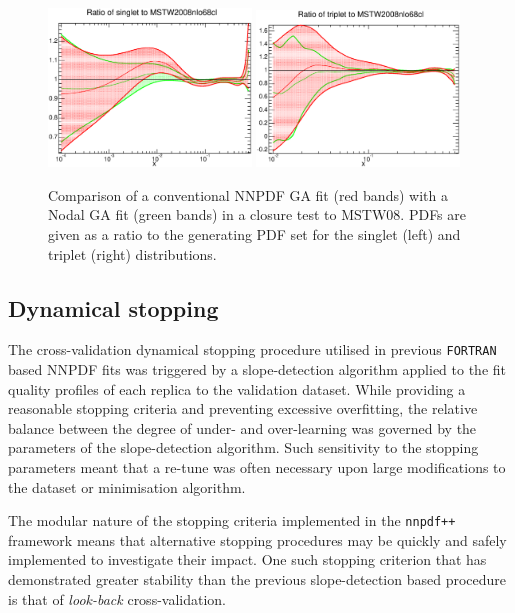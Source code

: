 \begin{figure}[!]
\centering
\includegraphics[width=0.48\textwidth]{7-PostLHC/figs/NodalGA/singlet.eps}
\includegraphics[width=0.48\textwidth]{7-PostLHC/figs/NodalGA/triplet.eps}
\caption[Comparison of a conventional NNPDF GA fit with a Nodal GA fit in a closure test to MSTW2008]{Comparison of a conventional NNPDF GA fit (red bands) with a Nodal GA fit (green bands) in a closure test to MSTW08. PDFs are given as a ratio to the generating PDF set for the singlet (left) and triplet (right) distributions.}
\label{fig:nodalvsnonnodal}
\end{figure}

\subsection{Dynamical stopping}
The cross-validation dynamical stopping procedure utilised in previous {\tt FORTRAN} based NNPDF fits was triggered by a slope-detection algorithm applied to the fit quality profiles of each replica to the validation dataset. While providing a reasonable stopping criteria and preventing excessive overfitting, the relative balance between the degree of under- and over-learning was governed by the parameters of the slope-detection algorithm. Such sensitivity to the stopping parameters meant that a re-tune was often necessary upon large modifications to the dataset or minimisation algorithm. 

The modular nature of the stopping criteria implemented in the {\tt nnpdf++} framework means that alternative stopping procedures may be quickly and safely implemented to investigate their impact. One such stopping criterion that has demonstrated greater stability than the previous slope-detection based procedure is that of \emph{look-back} cross-validation. 


